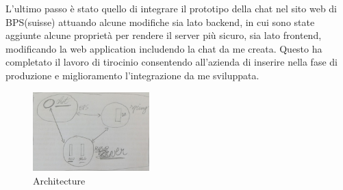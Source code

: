 L'ultimo passo è stato quello di integrare il prototipo della chat nel sito web di BPS(suisse) attuando alcune modifiche sia lato backend, in cui sono state aggiunte alcune proprietà per rendere il server più sicuro, sia lato frontend, modificando la web application includendo la chat da me creata.
Questo ha completato il lavoro di tirocinio consentendo all'azienda di inserire nella fase di produzione e miglioramento l'integrazione da me sviluppata.
\begin{figure}[H]
 \centering
    \includegraphics[width=0.4\textwidth]{img/last_architecture.jpg}
 \caption{Architecture}
\end{figure}

